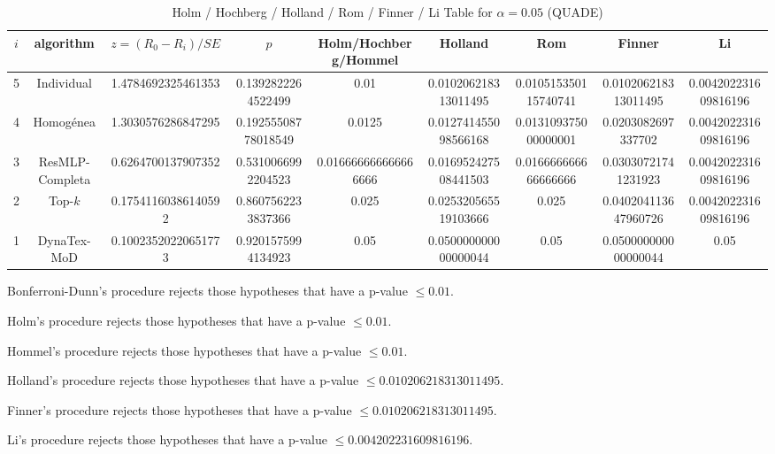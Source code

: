 \documentclass[a4paper,10pt]{article}
\begin{document}
\begin{landscape}
\begin{table}[!htp]
\centering\scriptsize
\caption{Holm / Hochberg / Holland / Rom / Finner / Li Table for $\alpha=0.05$ (QUADE)}
\begin{tabular}{ccccccccc}
$i$&algorithm&$z=(R_0 - R_i)/SE$&$p$&Holm/Hochberg/Hommel&Holland&Rom&Finner&Li\\
\hline
5&Individual&1.4784692325461353&0.1392822264522499&0.01&0.010206218313011495&0.010515350115740741&0.010206218313011495&0.004202231609816196\\
4&Homogénea&1.3030576286847295&0.19255508778018549&0.0125&0.012741455098566168&0.013109375000000001&0.0203082697337702&0.004202231609816196\\
3&ResMLP-Completa&0.6264700137907352&0.5310066992204523&0.016666666666666666&0.016952427508441503&0.016666666666666666&0.03030721741231923&0.004202231609816196\\
2&Top-$k$&0.17541160386140592&0.8607562233837366&0.025&0.025320565519103666&0.025&0.040204113647960726&0.004202231609816196\\
1&DynaTex-MoD&0.10023520220651773&0.9201575994134923&0.05&0.050000000000000044&0.05&0.050000000000000044&0.05\\
\hline
\end{tabular}
\end{table}
Bonferroni-Dunn's procedure rejects those hypotheses that have a p-value $\le0.01$.


Holm's procedure rejects those hypotheses that have a p-value $\le0.01$.


Hommel's procedure rejects those hypotheses that have a p-value $\le0.01$.


Holland's procedure rejects those hypotheses that have a p-value $\le0.010206218313011495$.


Finner's procedure rejects those hypotheses that have a p-value $\le0.010206218313011495$.


Li's procedure rejects those hypotheses that have a p-value $\le0.004202231609816196$.



\newpage


\end{landscape}
\end{document}
